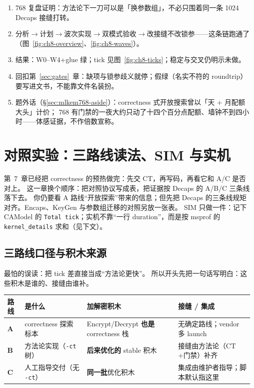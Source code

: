 \documentclass[UTF8,a4paper,11pt]{ctexart}
\theoremstyle{definition}
\theoremstyle{plain}
\theoremstyle{remark}
\numberwithin{figure}{section}
\numberwithin{table}{section}
\begin{document}
\begin{enumerate}
  \item 768 复盘证明：方法论下一刀可以是「换参数组」，不必只围着同一条 1024 Decaps 接缝打转。
  \item 分析$\to$计划$\to$波次实现$\to$双模式验收$\to$改接缝不改锁参——这条链跑通了（图~\ref{fig:ch8-overview}、\ref{fig:ch8-waves}）。
  \item 结果：W0--W4+glue 绿；tick 见图~\ref{fig:ch8-ticks}；稳定与交叉仍明示未做。
  \item 回扣第~\ref{sec:gates}~章：缺项与锁参歧义就停；假绿（名实不符的 roundtrip）要写进文书，不能靠文件名装扮。
  \item 题外话（§\ref{sec:mlkem768-aside}）：correctness 式开放搜索曾以「天 + 月配额大头」计价；
        768 有门禁的一夜大约只动了十四个百分点配额、墙钟不到四小时——体感证据，不作倍数宣称。
\end{enumerate}

\section{对照实验：三路线读法、SIM 与实机}
\label{sec:correctness}

第~7~章已经把 correctness 的预热做完：先交 $\mathrm{CT}$，再写码，再看它和 A/C 是否对上。
这一章换个顺序：把对照协议写成表，把证据按 Decaps 的 A/B/C 三条线落下去。
你仍要看 A 路线“开放探索”带来的信息；但先把 Decaps 的三条线规矩对齐。Encaps、KeyGen 与参数组迁移的对照另放一张表。
SIM 只做一件：记下 CAModel 的 \texttt{Total tick}；实机不靠“一行 duration”，而是按 msprof 的 \texttt{kernel\_details} 求和（见下文）。

\subsection{三路线口径与积木来源}
\label{sec:ch9-arms}

最怕的误读：把 tick 差直接当成“方法论更快”。
所以开头先把一句话写明白：这些积木是谁的、接缝由谁补。

\begin{center}
\small
\begin{tabular}{@{}L{1.2cm}L{3.2cm}L{4.2cm}L{4.8cm}@{}}
  \toprule
  路线 & 是什么 & 加解密积木 & 接缝 / 集成 \\
  \midrule
  \textbf{A} &
  correctness 探索标本 &
  Encrypt/Decrypt \textbf{也是} correctness 栈 &
  无确定路线；vendor 多 launch \\
  \textbf{B} &
  方法论实现（\texttt{-ct} 树） &
  \textbf{后来优化的} stable 积木 &
  接缝由方法论（$\mathrm{CT}$+门禁）补齐 \\
  \textbf{C} &
  人工指导交付（无 \texttt{-ct}） &
  \textbf{同一批}优化积木 &
  集成由维护者指导；脚本默认指这里 \\
  \bottomrule
\end{tabular}
\end{center}
\end{document}
